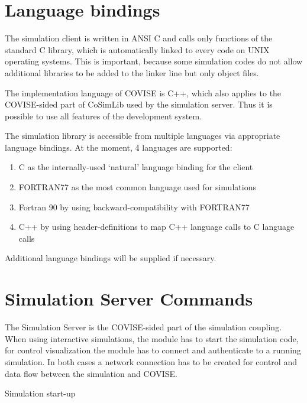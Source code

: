 \begin{htmlonly}
\section{Language bindings}
\latexonly
{}
\endlatexonly

The simulation client is written in ANSI C and calls only functions of the standard C 
library, which is automatically linked to every code on UNIX operating systems. This is 
important, because some simulation codes do not allow additional libraries to be added 
to the linker line but only object files.

The implementation language of COVISE is C++, which also applies to the COVISE-sided 
part of CoSimLib used by the simulation server.  Thus it is possible to use all features 
of the development system.

The simulation library is accessible from multiple languages via appropriate language 
bindings. At the moment, 4 languages are supported:

\begin{enumerate} 
\item C as the internally-used `natural' language binding for the client
\item FORTRAN77 as the most common language used for simulations
\item Fortran 90 by using backward-compatibility with FORTRAN77
\item C++ by using header-definitions to map C++ language calls to C language calls
\end{enumerate} 

Additional language bindings will be supplied if necessary.

 
\section{Simulation Server Commands}
\latexonly
{}
\endlatexonly

The Simulation Server is the COVISE-sided part of the simulation coupling. When using 
interactive simulations, the module has to start the simulation code, for control 
visualization the module has to connect and authenticate to a running simulation. In 
both cases a network connection has to be created for control and data flow between 
the simulation and COVISE.

\vspace*{1cm}
{\Large Simulation start-up}
\vspace*{0.5cm}


\end{htmlonly}
